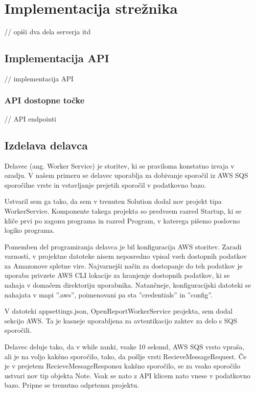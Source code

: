 \documentclass[a4paper, 12pt]{book}
\begin{document}
\section{Implementacija strežnika}

// opiši dva dela serverja itd

\subsection{Implementacija API}
 
// implementacija API

\subsubsection{API dostopne točke}

// API endpointi

\subsection{Izdelava delavca}

Delavec (ang. Worker Service) je storitev, ki se praviloma konstatno izvaja v ozadju.
V našem primeru se delavec uporablja za dobivanje sporočil iz AWS SQS sporočilne vrste in vstavljanje prejetih sporočil v podatkovno bazo.

Ustvaril sem ga tako, da sem v trenuten Solution dodal nov projekt tipa WorkerService.
Komponente takega projekta so predvsem razred Startup, ki se kliče prvi po zagonu programa in razred Program, v katerega pišemo poslovno logiko programa.

Pomemben del programiranja delavca je bil konfiguracija AWS storitev.
Zaradi varnosti, v projektne datoteke nisem neposredno vpisal vseh dostopnih podatkov za Amazonove spletne vire.
Najvarnejši način za dostopanje do teh podatkov je uporaba privzete AWS CLI lokacije za hranjenje dostopnih podatkov, ki se nahaja v domačem direktoriju uporabnika.
Natančneje, konfiguracijski datoteki se nahajata v mapi ''.aws'', poimenovani pa sta ''credentials'' in ''config''.

V datoteki appsettings.json, OpenReportWorkerService projekta, sem dodal sekcijo AWS.
Ta je kasneje uporabljena za avtentikacijo zahtev za delo s SQS sporočili.

Delavec deluje tako, da v while zanki, vsake 10 sekund, AWS SQS vrsto vpraša, ali je na voljo kakšno sporočilo, tako, da pošlje vrsti RecieveMessageRequest. 
Če je v prejetem RecieveMessageResponsu kakšno sporočilo, se za vsako sporočilo ustvari nov tip objekta Note.
Vsak se nato z API klicem nato vnese v podatkovno bazo.
Pripne se trenutno odprtemu projektu.
\end{document}
